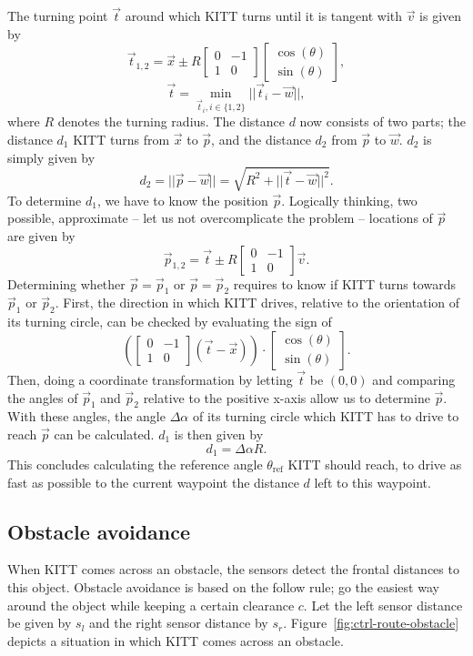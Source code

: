 \documentclass[11pt,titlepage]{report}
\begin{document}
The turning point $\vec{t}$ around which KITT turns until it is tangent with $\vec{v}$ is given by
\[
	\vec{t}_{1,2} = \vec{x} \pm R \begin{bmatrix}
		0 & -1 \\
		1 & 0
	\end{bmatrix} \begin{bmatrix}
		\cos{(\theta)} \\ \sin{(\theta)}
	\end{bmatrix},
\]
\[
	\vec{t} = \underset{\vec{t}_i, i \in \{1,2\}}{\operatorname{min}} ||\vec{t}_i - \vec{w} ||,
\]
where $R$ denotes the turning radius. The distance $d$ now consists of two parts; the distance $d_1$ KITT turns from $\vec{x}$ to $\vec{p}$, and the distance $d_2$ from $\vec{p}$ to $\vec{w}$. $d_2$ is simply given by
\[
	d_2 = ||\vec{p}-\vec{w}|| = \sqrt{R^2 + ||\vec{t} - \vec{w}||^2}.
\]
To determine $d_1$, we have to know the position $\vec{p}$. Logically thinking, two possible, approximate -- let us not overcomplicate the problem -- locations of $\vec{p}$ are given by
\[
	\vec{p}_{1,2} = \vec{t} \pm R \begin{bmatrix}
		0 & -1 \\
		1 & 0
	\end{bmatrix} \vec{v}.
\]
Determining whether $\vec{p} = \vec{p}_1$ or $\vec{p} = \vec{p}_2$ requires to know if KITT turns towards $\vec{p}_1$ or $\vec{p}_2$. First, the direction in which KITT drives, relative to the orientation of its turning circle, can be checked by evaluating the sign of
\[
	\left( \begin{bmatrix}
		0 & -1 \\
		1 & 0
	\end{bmatrix} \left( \vec{t} - \vec{x} \right) \right) \cdot \begin{bmatrix}
		\cos{(\theta)} \\
		\sin{(\theta)}
	\end{bmatrix}.
\]
Then, doing a coordinate transformation by letting $\vec{t}$ be $(0,0)$ and comparing the angles of $\vec{p}_1$ and $\vec{p}_2$ relative to the positive x-axis allow us to determine $\vec{p}$. With these angles, the angle $\Delta \alpha$ of its turning circle which KITT has to drive to reach $\vec{p}$ can be calculated. $d_1$ is then given by
\[
	d_1 = \Delta \alpha R.
\]
This concludes calculating the reference angle $\theta_{\text{ref}}$ KITT should reach, to drive as fast as possible to the current waypoint the distance $d$ left to this waypoint.

\subsection{Obstacle avoidance}
When KITT comes across an obstacle, the sensors detect the frontal distances to this object. Obstacle avoidance is based on the follow rule; go the easiest way around the object while keeping a certain clearance $c$. Let the left sensor distance be given by $s_l$ and the right sensor distance by $s_r$. Figure~\ref{fig:ctrl-route-obstacle} depicts a situation in which KITT comes across an obstacle.
\end{document}
